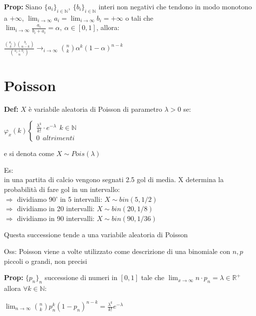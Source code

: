 \documentclass[11pt, letterpaper]{article}
\begin{document}
\newpage
\thispagestyle{fancy}

\textbf{Prop:} Siano $\{a_{i}\}_{i\in\mathbb{N}},\ \{b_{i}\}_{i\in\mathbb{N}}$ interi non negativi che tendono
in modo monotono a $+\infty$, $\lim_{i \to \infty} a_{i}=\lim_{i\to\infty} b_{i}=+\infty$ o tali che \\
$\lim_{i\to\infty} \frac{a_{i}}{b_{i}+a_{i}}= \alpha,\ \alpha\in[0,1]$, allora:
\begin{center}
    $\frac{\binom{a_{i}}{k}\binom{b_{i}}{n-k}}{\binom{a_{i}+b_{i}}{n}} \rightarrow_{i\to\infty}
    \binom{n}{k}\alpha^{k}(1-\alpha)^{n-k}$
\end{center}

\section{Poisson}
\textbf{Def:} $X$ è variabile aleatoria di Poisson di parametro $\lambda >0$ se:
\begin{center}
    $\varphi_{x}(k)\begin{cases}
        \frac{\lambda^{k}}{k!}\cdot e^{-\lambda}\ \ k\in\mathbb{N}\\
        0\ \ altrimenti
    \end{cases}$
\end{center} 
e si denota come $X\sim Pois(\lambda)$

Es:\\
in una partita di calcio vengono segnati 2.5 gol di media. X determina la probabilità di fare gol in un intervallo:\\
$\Rightarrow$ dividiamo 90' in 5 intervalli: $X\sim bin(5,1/2)$\\
$\Rightarrow$ dividiamo in 20 intervalli: $X\sim bin(20,1/8)$\\
$\Rightarrow$ dividiamo in 90 intervalli: $X\sim bin(90,1/36)$

Questa successione tende a una variabile aleatoria di Poisson

Oss: Poisson viene a volte utilizzato come descrizione di una binomiale con $n,p$ piccoli o grandi, non precisi

\textbf{Prop:} $\{p_{n}\}_{n}$ successione di numeri in $[0,1]$ tale che $\lim_{x\to\infty}n\cdot p_{n}=
\lambda\in\mathbb{R}^{+}$ allora $\forall k\in\mathbb{N}$:
\begin{center}
    $\lim_{n\to\infty} \binom{n}{k}p_{n}^{k}(1-p_{n})^{n-k}=\frac{\lambda^{k}}{k!}e^{-\lambda}$
\end{center}
\end{document}
